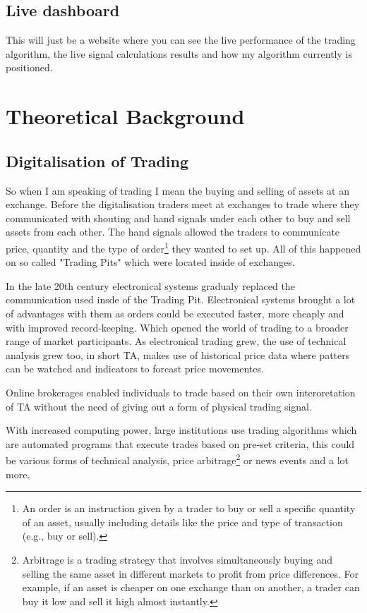 \documentclass[12pt]{article}
\begin{document}
\subsection{Live dashboard}
This will just be a website where you can see the live performance of the trading algorithm, the live signal calculations results and how my algorithm currently is positioned.



\newpage

\section{Theoretical Background}
\subsection{Digitalisation of Trading}
So when I am speaking of trading I mean the buying and selling of assets at an exchange. Before the digitalisation traders meet at exchanges to trade where they communicated with shouting and hand signals under each other to buy and sell assets from each other. The hand signals allowed the traders to communicate price, quantity and the type of order\footnote{An order is an instruction given by a trader to buy or sell a specific quantity of an asset, usually including details like the price and type of transaction (e.g., buy or sell).}
they wanted to set up.  All of this happened on so called "Trading Pits" which were located inside of exchanges.


In the late 20th century electronical systems gradualy replaced the communication used insde of the Trading Pit. Electronical systems brought a lot of advantages with them as orders could be executed faster, more cheaply and with improved record-keeping. Which opened the world of trading to a broader range of market participants. 
As electronical trading grew, the use of technical analysis grew too, in short TA, makes use of historical price data where patters can be watched and indicators to forcast price movementes.

Online brokerages enabled individuals to trade based on their own interoretation of TA without the need of giving out a form of physical trading signal.

With increased computing power, large institutions use trading algorithms which are automated programs that execute trades based on pre-set criteria, this could be various forms of technical analysis, price arbitrage\footnote{Arbitrage is a trading strategy that involves simultaneously buying and selling the same asset in different markets to profit from price differences. For example, if an asset is cheaper on one exchange than on another, a trader can buy it low and sell it high almost instantly.} or news events and a lot more.
\end{document}
